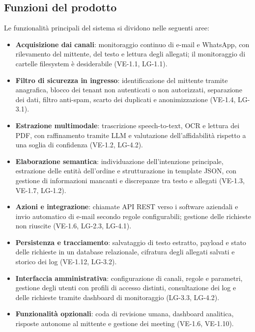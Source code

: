 \subsection{Funzioni del prodotto}
Le funzionalità principali del sistema si dividono nelle seguenti aree:
	\begin{itemize}
		\item \textbf{Acquisizione dai canali}: monitoraggio continuo di e-mail e WhatsApp, con rilevamento del mittente, del testo e lettura degli allegati; il monitoraggio di cartelle filesystem è desiderabile (VE-1.1, LG-1.1).
		\item \textbf{Filtro di sicurezza in ingresso}: identificazione del mittente tramite anagrafica, blocco dei tenant non autenticati o non autorizzati, separazione dei dati, filtro anti-spam, scarto dei duplicati e anonimizzazione (VE-1.4, LG-3.1).
		\item \textbf{Estrazione multimodale}: trascrizione speech-to-text, OCR e lettura dei PDF, con raffinamento tramite LLM e valutazione dell'affidabilità rispetto a una soglia di confidenza (VE-1.2, LG-4.2).
		\item \textbf{Elaborazione semantica}: individuazione dell'intenzione principale, estrazione delle entità dell'ordine e strutturazione in template JSON, con gestione di informazioni mancanti e discrepanze tra testo e allegati (VE-1.3, VE-1.7, LG-1.2).
		\item \textbf{Azioni e integrazione}: chiamate API REST verso i software aziendali e invio automatico di e-mail secondo regole configurabili; gestione delle richieste non riuscite (VE-1.6, LG-2.3, LG-4.1).
		\item \textbf{Persistenza e tracciamento}: salvataggio di testo estratto, payload e stato delle richieste in un database relazionale, cifratura degli allegati salvati e storico dei log (VE-1.12, LG-3.2).
		\item \textbf{Interfaccia amministrativa}: configurazione di canali, regole e parametri, gestione degli utenti con profili di accesso distinti, consultazione dei log e delle richieste tramite dashboard di monitoraggio (LG-3.3, LG-4.2).
		\item \textbf{Funzionalità opzionali}: coda di revisione umana, dashboard analitica, risposte autonome al mittente e gestione dei meeting (VE-1.6, VE-1.10).
	\end{itemize}

